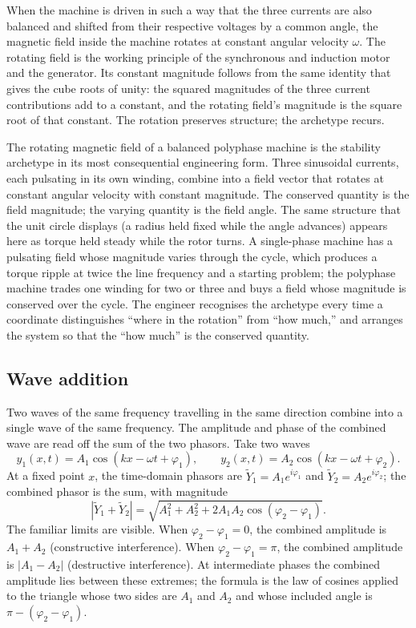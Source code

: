 When the machine is driven in such a way that the three currents
are also balanced and shifted from their respective voltages by a
common angle, the magnetic field inside the machine rotates at
constant angular velocity $\omega$. The rotating field is the
working principle of the synchronous and induction motor and the
generator. Its constant magnitude follows from the same identity
that gives the cube roots of unity: the squared magnitudes of the
three current contributions add to a constant, and the rotating
field's magnitude is the square root of that constant. The
rotation preserves structure; the archetype recurs.

\begin{archetype}
The rotating magnetic field of a balanced polyphase machine is the
stability archetype in its most consequential engineering form. Three
sinusoidal currents, each pulsating in its own winding, combine into
a field vector that rotates at constant angular velocity with constant
magnitude. The conserved quantity is the field magnitude; the varying
quantity is the field angle. The same structure that the unit circle
displays (a radius held fixed while the angle advances) appears here
as torque held steady while the rotor turns. A single-phase machine
has a pulsating field whose magnitude varies through the cycle, which
produces a torque ripple at twice the line frequency and a starting
problem; the polyphase machine trades one winding for two or three
and buys a field whose magnitude is conserved over the cycle. The
engineer recognises the archetype every time a coordinate
distinguishes ``where in the rotation'' from ``how much,'' and
arranges the system so that the ``how much'' is the conserved
quantity.
\end{archetype}

\subsection{Wave addition}

Two waves of the same frequency travelling in the same direction
combine into a single wave of the same frequency. The amplitude
and phase of the combined wave are read off the sum of the two
phasors. Take two waves
\[
y_{1}(x, t) = A_{1}\cos(kx - \omega t + \varphi_{1}), \qquad y_{2}(x, t) = A_{2}\cos(kx - \omega t + \varphi_{2}).
\]
At a fixed point $x$, the time-domain phasors are $\tilde{Y}_{1}
= A_{1} e^{i\varphi_{1}}$ and $\tilde{Y}_{2} = A_{2} e^{i\varphi_{2}}$;
the combined phasor is the sum, with magnitude
\[
|\tilde{Y}_{1} + \tilde{Y}_{2}| = \sqrt{A_{1}^{2} + A_{2}^{2} + 2 A_{1} A_{2}\cos(\varphi_{2} - \varphi_{1})}.
\]
The familiar limits are visible. When $\varphi_{2} - \varphi_{1}
= 0$, the combined amplitude is $A_{1} + A_{2}$ (constructive
interference). When $\varphi_{2} - \varphi_{1} = \pi$, the
combined amplitude is $|A_{1} - A_{2}|$ (destructive interference).
At intermediate phases the combined amplitude lies between these
extremes; the formula is the law of cosines applied to the
triangle whose two sides are $A_{1}$ and $A_{2}$ and whose
included angle is $\pi - (\varphi_{2} - \varphi_{1})$.

